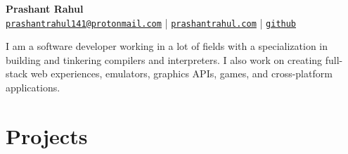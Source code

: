 \documentclass[a4paper,11pt]{article}
\begin{document}
\begin{center}
    {\huge \textbf{Prashant Rahul}} \\
    {\footnotesize \texttt{\href{mailto:prashantrahul141@protonmail.com}{prashantrahul141@protonmail.com}} | 
    \texttt{\href{https://prashantrahul.com}{prashantrahul.com}} | 
    \texttt{\href{https://github.com/prashantrahul141}{github}}} \\
\end{center}

I am a software developer working in a lot of fields with a specialization in building and tinkering compilers and interpreters. I also work on creating full-stack web experiences, emulators, graphics APIs, games, and cross-platform applications.

\section*{Projects}
\end{document}
